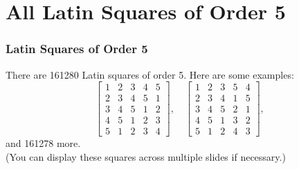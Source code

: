 \documentclass{beamer}
\begin{document}
\section{All Latin Squares of Order 5}
\begin{frame}
\frametitle{Latin Squares of Order 5}
There are 161280 Latin squares of order 5. Here are some examples:
\[
\begin{bmatrix}
1 & 2 & 3 & 4 & 5 \\
2 & 3 & 4 & 5 & 1 \\
3 & 4 & 5 & 1 & 2 \\
4 & 5 & 1 & 2 & 3 \\
5 & 1 & 2 & 3 & 4
\end{bmatrix},
\quad
\begin{bmatrix}
1 & 2 & 3 & 5 & 4 \\
2 & 3 & 4 & 1 & 5 \\
3 & 4 & 5 & 2 & 1 \\
4 & 5 & 1 & 3 & 2 \\
5 & 1 & 2 & 4 & 3
\end{bmatrix},
\]
and 161278 more.\\
(You can display these squares across multiple slides if necessary.)
\end{frame}
\end{document}
